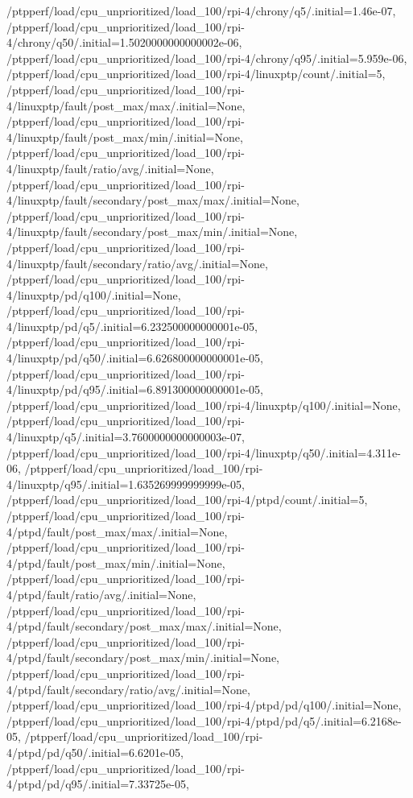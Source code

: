 {    /ptpperf/load/cpu_unprioritized/load_100/rpi-4/chrony/q5/.initial=1.46e-07,
    /ptpperf/load/cpu_unprioritized/load_100/rpi-4/chrony/q50/.initial=1.5020000000000002e-06,
    /ptpperf/load/cpu_unprioritized/load_100/rpi-4/chrony/q95/.initial=5.959e-06,
    /ptpperf/load/cpu_unprioritized/load_100/rpi-4/linuxptp/count/.initial=5,
    /ptpperf/load/cpu_unprioritized/load_100/rpi-4/linuxptp/fault/post_max/max/.initial=None,
    /ptpperf/load/cpu_unprioritized/load_100/rpi-4/linuxptp/fault/post_max/min/.initial=None,
    /ptpperf/load/cpu_unprioritized/load_100/rpi-4/linuxptp/fault/ratio/avg/.initial=None,
    /ptpperf/load/cpu_unprioritized/load_100/rpi-4/linuxptp/fault/secondary/post_max/max/.initial=None,
    /ptpperf/load/cpu_unprioritized/load_100/rpi-4/linuxptp/fault/secondary/post_max/min/.initial=None,
    /ptpperf/load/cpu_unprioritized/load_100/rpi-4/linuxptp/fault/secondary/ratio/avg/.initial=None,
    /ptpperf/load/cpu_unprioritized/load_100/rpi-4/linuxptp/pd/q100/.initial=None,
    /ptpperf/load/cpu_unprioritized/load_100/rpi-4/linuxptp/pd/q5/.initial=6.232500000000001e-05,
    /ptpperf/load/cpu_unprioritized/load_100/rpi-4/linuxptp/pd/q50/.initial=6.626800000000001e-05,
    /ptpperf/load/cpu_unprioritized/load_100/rpi-4/linuxptp/pd/q95/.initial=6.891300000000001e-05,
    /ptpperf/load/cpu_unprioritized/load_100/rpi-4/linuxptp/q100/.initial=None,
    /ptpperf/load/cpu_unprioritized/load_100/rpi-4/linuxptp/q5/.initial=3.7600000000000003e-07,
    /ptpperf/load/cpu_unprioritized/load_100/rpi-4/linuxptp/q50/.initial=4.311e-06,
    /ptpperf/load/cpu_unprioritized/load_100/rpi-4/linuxptp/q95/.initial=1.635269999999999e-05,
    /ptpperf/load/cpu_unprioritized/load_100/rpi-4/ptpd/count/.initial=5,
    /ptpperf/load/cpu_unprioritized/load_100/rpi-4/ptpd/fault/post_max/max/.initial=None,
    /ptpperf/load/cpu_unprioritized/load_100/rpi-4/ptpd/fault/post_max/min/.initial=None,
    /ptpperf/load/cpu_unprioritized/load_100/rpi-4/ptpd/fault/ratio/avg/.initial=None,
    /ptpperf/load/cpu_unprioritized/load_100/rpi-4/ptpd/fault/secondary/post_max/max/.initial=None,
    /ptpperf/load/cpu_unprioritized/load_100/rpi-4/ptpd/fault/secondary/post_max/min/.initial=None,
    /ptpperf/load/cpu_unprioritized/load_100/rpi-4/ptpd/fault/secondary/ratio/avg/.initial=None,
    /ptpperf/load/cpu_unprioritized/load_100/rpi-4/ptpd/pd/q100/.initial=None,
    /ptpperf/load/cpu_unprioritized/load_100/rpi-4/ptpd/pd/q5/.initial=6.2168e-05,
    /ptpperf/load/cpu_unprioritized/load_100/rpi-4/ptpd/pd/q50/.initial=6.6201e-05,
    /ptpperf/load/cpu_unprioritized/load_100/rpi-4/ptpd/pd/q95/.initial=7.33725e-05,
}
